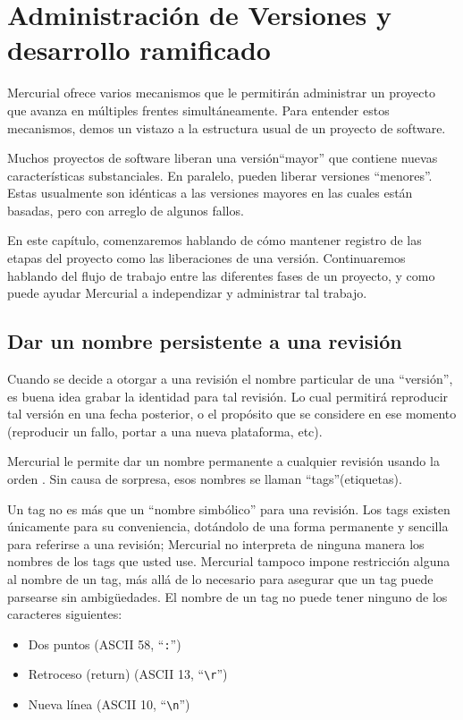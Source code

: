 \chapter{Administración de Versiones y desarrollo ramificado}
\label{chap:branch}

Mercurial ofrece varios mecanismos que le permitirán administrar un
proyecto que avanza en múltiples frentes simultáneamente. Para
entender estos mecanismos, demos un vistazo a la estructura usual de
un proyecto de software.

Muchos proyectos de software liberan una versión``mayor'' que contiene
nuevas características substanciales.  En paralelo, pueden liberar
versiones ``menores''.   Estas usualmente son idénticas a las
versiones mayores en las cuales están basadas, pero con arreglo de
algunos fallos.

En este capítulo, comenzaremos hablando de cómo mantener registro de
las etapas del proyecto como las liberaciones de una
versión. Continuaremos hablando del flujo de trabajo entre las
diferentes fases de un proyecto, y como puede ayudar Mercurial a
independizar y administrar tal trabajo.

\section{Dar un nombre persistente a una revisión}

Cuando se decide a otorgar a una revisión el nombre particular de una
``versión'', es buena idea grabar la identidad para tal revisión.
Lo cual permitirá reproducir tal versión en una fecha posterior, o el
propósito que se considere en ese momento (reproducir un fallo, portar
a una nueva plataforma, etc).

Mercurial le permite dar un nombre permanente a cualquier revisión
usando la orden .  Sin causa de sorpresa, esos nombres se llaman
``tags''(etiquetas).

Un tag no es más que un ``nombre simbólico'' para una revisión.  Los
tags existen únicamente para su conveniencia, dotándolo de una forma
permanente y sencilla para referirse a una revisión; Mercurial no
interpreta de ninguna manera los nombres de los tags que usted use.
Mercurial tampoco impone restricción alguna al nombre de un tag, más
allá de lo necesario para asegurar que un tag puede parsearse sin
ambigüedades. El nombre de un tag no puede tener ninguno de los
caracteres siguientes:
\begin{itemize}
\item Dos puntos (ASCII 58, ``\texttt{:}'')
\item Retroceso (return) (ASCII 13, ``\Verb+\r+'')
\item Nueva línea (ASCII 10, ``\Verb+\n+'')
\end{itemize}


